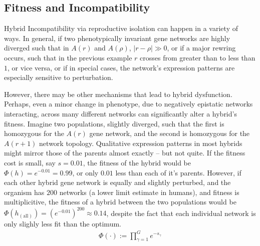\documentclass[11 pt]{article}
\newcommand{\1}{\mathbbm{1}}
\begin{document}
     \subsection{Fitness and Incompatibility}
     Hybrid Incompatibility via reproductive isolation can happen in a variety of ways. In general, if two phenotypically invariant gene networks are highly diverged such that in $A(r)$ and $A(\rho)$, $|r-\rho| \gg 0$, or if a major rewring occurs, such that in the previous example $r$ crosses from greater than to less than $1$, or vice versa, or if in special cases, the network's expression patterns are especially sensitive to perturbation. 

     However, there may be other mechanisms that lead to hybrid dysfunction. Perhaps, even a minor change in phenotype, due to negatively epistatic networks interacting, across many different networks can significantly alter a hybrid's fitness. Imagine two populations, slightly diverged, such that the first is homozygous for the $A(r)$ gene network, and the second is homozygous for the $A(r+1)$ network topology. Qualitative expression patterns in most hybrids might mirror those of the parents almost exactly -- but not quite. If the fitness cost is small, say $s=0.01$, the fitness of the hybrid would be $\Phi(h) = e^{-0.01} = 0.99$, or only $0.01$ less than each of it's parents. However, if each other hybrid gene network is equally and slightly perturbed, and the organism has $200$ networks (a lower limit estimate in humans), and fitness is multiplicitive, the fitness of a hybrid between the two populations would be $\Phi(h_{(\text{all})}) = \left( e^{-0.01} \right)^{200} \approx 0.14$, despite the fact that each individual network is only slighly less fit than the optimum. 
     \begin{align*}
        \Phi(\cdot) := \prod_{\gamma = 1}^{G} e^{-s_{\gamma}}
     \end{align*}
\end{document}
